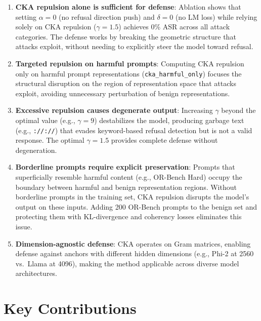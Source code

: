 \documentclass[11pt]{article}
\begin{document}
\begin{enumerate}
    \item \textbf{CKA repulsion alone is sufficient for defense}: Ablation shows that setting $\alpha = 0$ (no refusal direction push) and $\delta = 0$ (no LM loss) while relying solely on CKA repulsion ($\gamma = 1.5$) achieves 0\% ASR across all attack categories. The defense works by breaking the geometric structure that attacks exploit, without needing to explicitly steer the model toward refusal.

    \item \textbf{Targeted repulsion on harmful prompts}: Computing CKA repulsion only on harmful prompt representations (\texttt{cka\_harmful\_only}) focuses the structural disruption on the region of representation space that attacks exploit, avoiding unnecessary perturbation of benign representations.

    \item \textbf{Excessive repulsion causes degenerate output}: Increasing $\gamma$ beyond the optimal value (e.g., $\gamma = 9$) destabilizes the model, producing garbage text (e.g., \texttt{://://}) that evades keyword-based refusal detection but is not a valid response. The optimal $\gamma = 1.5$ provides complete defense without degeneration.

    \item \textbf{Borderline prompts require explicit preservation}: Prompts that superficially resemble harmful content (e.g., OR-Bench Hard) occupy the boundary between harmful and benign representation regions. Without borderline prompts in the training set, CKA repulsion disrupts the model's output on these inputs. Adding 200 OR-Bench prompts to the benign set and protecting them with KL-divergence and coherency losses eliminates this issue.

    \item \textbf{Dimension-agnostic defense}: CKA operates on Gram matrices, enabling defense against anchors with different hidden dimensions (e.g., Phi-2 at 2560 vs.\ Llama at 4096), making the method applicable across diverse model architectures.
\end{enumerate}

\section{Key Contributions}
\end{document}
